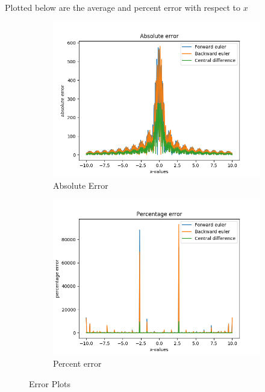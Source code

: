 \documentclass[12pt]{article}
\begin{document}
Plotted below are the average and percent error with respect to $x$ 
\begin{figure}[h]
	\centering
	\begin{subfigure}[h]{0.40\textwidth}
		\centering
		\includegraphics[width=\textwidth]{gdprimeabserror400.png}
		\caption{Absolute Error }
	\end{subfigure}
	\begin{subfigure}[h]{0.40\textwidth}
		\centering
		\includegraphics[width=\textwidth]{gdprimepercenterror400.png}
		\caption{Percent error}
	\end{subfigure}
	\caption{Error Plots}
\end{figure}\\\\\\\\\\\\\\\\
\end{document}
